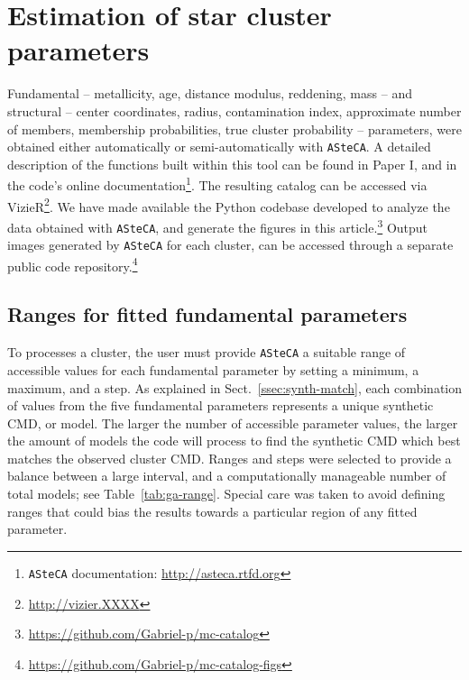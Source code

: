 \documentclass{aa}
\begin{document}

\section{Estimation of star cluster parameters}
\label{sec:fund-params}

Fundamental -- metallicity, age, distance modulus, reddening, mass -- and
structural -- center coordinates, radius, contamination index, approximate
number of members, membership probabilities, true cluster probability --
parameters, were obtained either automatically or semi-automatically with
\texttt{ASteCA}.
%
A detailed description of the functions built within this tool can be found in
Paper I, and in the code's online documentation\footnote{\texttt{ASteCA}
documentation: \url{http://asteca.rtfd.org}}.
%
The resulting catalog can be accessed via
VizieR\footnote{\url{http://vizier.XXXX}}.
We have made available the Python codebase developed to analyze
the data obtained with \texttt{ASteCA}, and generate the figures in this
article.\footnote{\url{https://github.com/Gabriel-p/mc-catalog}}
%
Output images generated by \texttt{ASteCA} for each cluster, can be
accessed through a separate public code
repository.\footnote{\url{https://github.com/Gabriel-p/mc-catalog-figs}}



\subsection{Ranges for fitted fundamental parameters}
\label{ssec:param-ranges}

To processes a cluster, the user must provide \texttt{ASteCA} a
suitable range of accessible values for each fundamental parameter by
setting a minimum, a maximum, and a step.
%
As explained in Sect.~\ref{ssec:synth-match}, each combination of values
from the five fundamental parameters represents a unique synthetic CMD, or
model.
%
%
The larger the number of accessible parameter values, the larger the
amount of models the code will process to find the synthetic CMD which best
matches the observed cluster CMD.\@
%
Ranges and steps were selected to provide a balance between a large interval,
and a computationally manageable number of total models;
see Table~\ref{tab:ga-range}. Special care was taken to avoid defining ranges
that could bias the results towards a particular region of any fitted
parameter.\\
\end{document}
